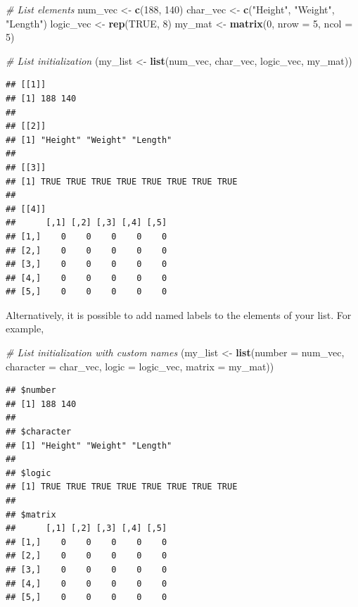 \documentclass[12pt,]{krantz}
\newenvironment{Shaded}{\begin{snugshade}}{\end{snugshade}}
\newcommand{\KeywordTok}[1]{\textcolor[rgb]{0.27,0.27,0.27}{\textbf{#1}}}
\newcommand{\DataTypeTok}[1]{\textcolor[rgb]{0.27,0.27,0.27}{#1}}
\newcommand{\DecValTok}[1]{\textcolor[rgb]{0.06,0.06,0.06}{#1}}
\newcommand{\StringTok}[1]{\textcolor[rgb]{0.5,0.5,0.5}{#1}}
\newcommand{\CommentTok}[1]{\textcolor[rgb]{0.37,0.37,0.37}{\textit{#1}}}
\newcommand{\OtherTok}[1]{\textcolor[rgb]{0.37,0.37,0.37}{#1}}
\newcommand{\NormalTok}[1]{#1}
\begin{document}
\begin{Shaded}
\begin{Highlighting}[]
\CommentTok{# List elements}
\NormalTok{num_vec <-}\StringTok{ }\KeywordTok{c}\NormalTok{(}\DecValTok{188}\NormalTok{, }\DecValTok{140}\NormalTok{)}
\NormalTok{char_vec <-}\StringTok{ }\KeywordTok{c}\NormalTok{(}\StringTok{"Height"}\NormalTok{, }\StringTok{"Weight"}\NormalTok{, }\StringTok{"Length"}\NormalTok{)}
\NormalTok{logic_vec <-}\StringTok{ }\KeywordTok{rep}\NormalTok{(}\OtherTok{TRUE}\NormalTok{, }\DecValTok{8}\NormalTok{)}
\NormalTok{my_mat <-}\StringTok{ }\KeywordTok{matrix}\NormalTok{(}\DecValTok{0}\NormalTok{, }\DataTypeTok{nrow =} \DecValTok{5}\NormalTok{, }\DataTypeTok{ncol =} \DecValTok{5}\NormalTok{)}

\CommentTok{# List initialization }
\NormalTok{(my_list <-}\StringTok{ }\KeywordTok{list}\NormalTok{(num_vec, char_vec, logic_vec, my_mat))}
\end{Highlighting}
\end{Shaded}

\begin{verbatim}
## [[1]]
## [1] 188 140
## 
## [[2]]
## [1] "Height" "Weight" "Length"
## 
## [[3]]
## [1] TRUE TRUE TRUE TRUE TRUE TRUE TRUE TRUE
## 
## [[4]]
##      [,1] [,2] [,3] [,4] [,5]
## [1,]    0    0    0    0    0
## [2,]    0    0    0    0    0
## [3,]    0    0    0    0    0
## [4,]    0    0    0    0    0
## [5,]    0    0    0    0    0
\end{verbatim}

Alternatively, it is possible to add named labels to the elements of
your list. For example,

\begin{Shaded}
\begin{Highlighting}[]
\CommentTok{# List initialization with custom names }
\NormalTok{(my_list <-}\StringTok{ }\KeywordTok{list}\NormalTok{(}\DataTypeTok{number =}\NormalTok{ num_vec, }\DataTypeTok{character =}\NormalTok{ char_vec, }
                 \DataTypeTok{logic =}\NormalTok{ logic_vec, }\DataTypeTok{matrix =}\NormalTok{ my_mat))}
\end{Highlighting}
\end{Shaded}

\begin{verbatim}
## $number
## [1] 188 140
## 
## $character
## [1] "Height" "Weight" "Length"
## 
## $logic
## [1] TRUE TRUE TRUE TRUE TRUE TRUE TRUE TRUE
## 
## $matrix
##      [,1] [,2] [,3] [,4] [,5]
## [1,]    0    0    0    0    0
## [2,]    0    0    0    0    0
## [3,]    0    0    0    0    0
## [4,]    0    0    0    0    0
## [5,]    0    0    0    0    0
\end{verbatim}
\end{document}
